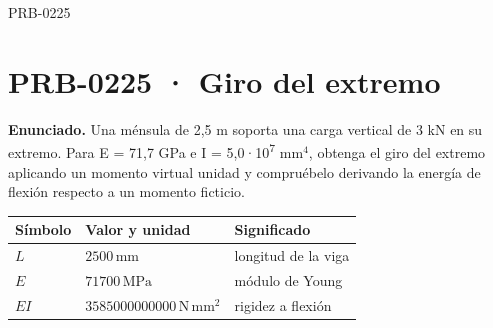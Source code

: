 \begin{studiumworked}{PRB-0225}

\section{PRB-0225 · Giro del extremo}

\textbf{Enunciado.} Una ménsula de 2,5 m soporta una carga vertical de 3 kN en su extremo. Para E = 71,7 GPa e I = 5,0·10\textsuperscript{7} mm$^4$, obtenga el giro del extremo aplicando un momento virtual unidad y compruébelo derivando la energía de flexión respecto a un momento ficticio.

\par\medskip\noindent\begin{tabular}{@{}p{.18\linewidth}p{.26\linewidth}p{.48\linewidth}@{}}
\toprule Símbolo & Valor y unidad & Significado\\\midrule
$L$ & $2500\,\mathrm{mm}$ & longitud de la viga\\
$E$ & $71700\,\mathrm{MPa}$ & módulo de Young\\
$EI$ & $3585000000000\,\mathrm{N\,mm^2}$ & rigidez a flexión\\
\bottomrule\end{tabular}\par\medskip


\end{studiumworked}
